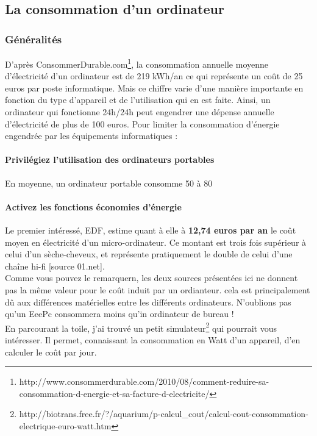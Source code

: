 \documentclass[a4paper,11pt,french]{article}
\begin{document}
\subsection{La consommation d'un ordinateur}

\subsubsection{Généralités}
D'après ConsommerDurable.com\footnote{\textsf{http://www.consommerdurable.com/2010/08/comment-reduire-sa-consommation-d-energie-et-sa-facture-d-electricite/}}, la consommation annuelle moyenne d’électricité d’un ordinateur est de 219 kWh/an ce qui représente un coût de 25 euros par poste informatique. Mais ce chiffre varie d’une manière importante en fonction du type d’appareil et de l’utilisation qui en est faite. Ainsi, un ordinateur qui fonctionne 24h/24h peut engendrer une dépense annuelle d’électricité de plus de 100 euros. Pour limiter la consommation d’énergie engendrée par les équipements informatiques :

\paragraph{Privilégiez l’utilisation des ordinateurs portables}
En moyenne, un ordinateur portable consomme 50 à 80%

\paragraph{Activez les fonctions \og économies d’énergie \fg}
Le premier intéressé, EDF, estime quant à elle à \textbf{12,74 euros par an} le coût moyen en électricité d'un micro-ordinateur. Ce montant est trois fois supérieur à celui d'un sèche-cheveux, et représente pratiquement le double de celui d'une chaîne hi-fi [source 01.net].\\

Comme vous pouvez le remarquern, les deux sources présentées ici ne donnent pas la même valeur pour le coût induit par un ordianteur. cela est principalement dû aux différences matérielles entre les différents ordinateurs. N'oublions pas qu'un EeePc consommera moins qu'in ordinateur de bureau !\\

En parcourant la toile, j'ai trouvé un petit simulateur\footnote{\textsf{http://biotrans.free.fr/?/aquarium/p-calcul\_{}cout/calcul-cout-consommation-electrique-euro-watt.htm}} qui pourrait vous intéresser. Il permet, connaissant la consommation en Watt d'un appareil, d'en calculer le coût par jour.\\
\end{document}
